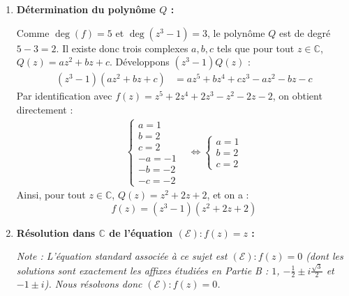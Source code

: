 \documentclass[12pt,a4paper]{article}
\begin{document}
\begin{enumerate}
    \item \textbf{Détermination du polynôme $Q$ :}
    
    Comme $\deg(f) = 5$ et $\deg(z^3 - 1) = 3$, le polynôme $Q$ est de degré $5 - 3 = 2$. Il existe donc trois complexes $a, b, c$ tels que pour tout $z \in \mathbb{C}$, $Q(z) = az^2 + bz + c$. Développons $(z^3 - 1)Q(z)$ :
    $$
    \begin{aligned}
        (z^3 - 1)(az^2 + bz + c) &= az^5 + bz^4 + cz^3 - az^2 - bz - c
    \end{aligned}
    $$
    Par identification avec $f(z) = z^5 + 2z^4 + 2z^3 - z^2 - 2z - 2$, on obtient directement :
    $$
    \begin{aligned}
        \left\{
        \begin{array}{l}
            a = 1 \\
            b = 2 \\
            c = 2 \\
            -a = -1 \\
            -b = -2 \\
            -c = -2
        \end{array}
        \right.
        &\iff
        \left\{
        \begin{array}{l}
            a = 1 \\
            b = 2 \\
            c = 2
        \end{array}
        \right.
    \end{aligned}
    $$
    Ainsi, pour tout $z \in \mathbb{C}$, $Q(z) = z^2 + 2z + 2$, et on a :
    $$
    f(z) = (z^3 - 1)(z^2 + 2z + 2)
    $$

    \item \textbf{Résolution dans $\mathbb{C}$ de l'équation $(\mathcal{E}) : f(z) = z$ :}
    
    \textit{Note : L'équation standard associée à ce sujet est $(\mathcal{E}) : f(z) = 0$ (dont les solutions sont exactement les affixes étudiées en Partie B : $1$, $-\frac{1}{2} \pm i\frac{\sqrt{3}}{2}$ et $-1 \pm i$). Nous résolvons donc $(\mathcal{E}) : f(z) = 0$.}
    

\end{enumerate}
\end{document}
